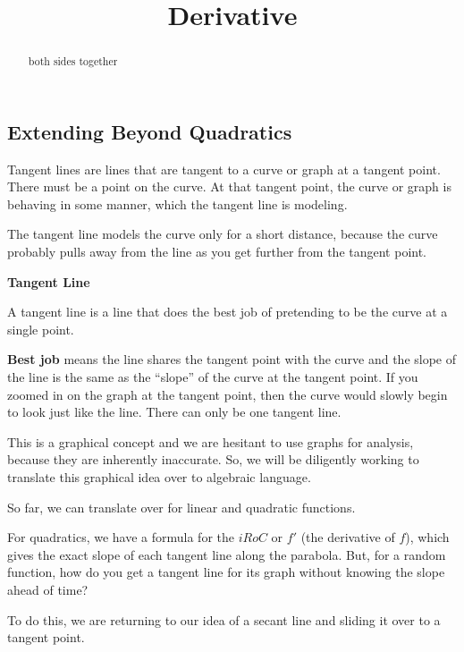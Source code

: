 \documentclass{ximera}
\title{Derivative}
\begin{document}
\begin{abstract}
both sides together
\end{abstract}
\maketitle
 
 



\subsection*{Extending Beyond Quadratics} 


Tangent lines are lines that are tangent to a curve or graph at a tangent point. There must be a point on the curve. At that tangent point, the curve or graph is behaving in some manner, which the tangent line is modeling.  

The tangent line models the curve only for a short distance, because the curve probably pulls away from the line as you get further from the tangent point.

\begin{idea} \textbf{\textcolor{blue!55!black}{Tangent Line}}


A tangent line is a line that does the best job of pretending to be the curve at a single point.
\end{idea}


\textbf{Best job} means the line shares the tangent point with the curve and the slope of the line is the same as the ``slope'' of the curve at the tangent point. If you zoomed in on the graph at the tangent point, then the curve would slowly begin to look just like the line. There can only be one tangent line.

This is a graphical concept and we are hesitant to use graphs for analysis, because they are inherently inaccurate. So, we will be diligently working to translate this graphical idea over to algebraic language. 

So far, we can translate over for linear and quadratic functions.

For quadratics, we have a formula for the $iRoC$ or $f'$ (the derivative of $f$), which gives the exact slope of each tangent line along the parabola.  But, for a random function, how do you get a tangent line for its graph without knowing the slope ahead of time? 


To do this, we are returning to our idea of a secant line and sliding it over to a tangent point. 
\end{document}
